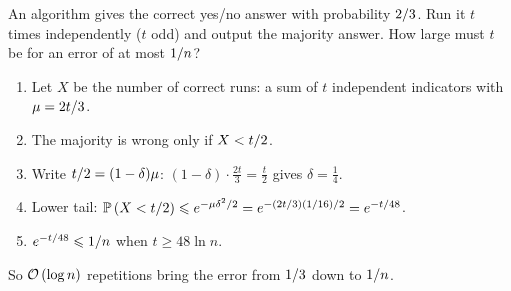 \begin{exercisebox}
\begin{pproblem}\label{pp:majority}
    An algorithm gives the correct yes/no answer with probability $2/3$. Run it $t$ times
    independently ($t$ odd) and output the majority answer. How large must $t$ be for an error of at
    most $1/n$?
\end{pproblem}
\tcblower
\begin{wsolution}
    \leavevmode
    \begin{enumerate}
        \item Let $X$ be the number of correct runs: a sum of $t$ independent indicators with
              $\mu = 2t/3$.
        \item The majority is wrong only if $X < t/2$.
        \item Write $t/2 = (1 - \delta)\mu$: $(1 - \delta) \cdot \frac{2t}{3} = \frac{t}{2}$
              gives $\delta = \frac{1}{4}$.
        \item Lower tail:
              $\operatorname{\mathbb{P}}\left(X < t/2\right) \leqslant e^{-\mu\delta^2/2} = e^{-(2t/3)(1/16)/2} = e^{-t/48}$.
        \item $e^{-t/48} \leqslant 1/n$ when $t \geq 48 \ln n$.
    \end{enumerate}
    So $\mathcal{O}\left(\log n\right)$ repetitions bring the error from $1/3$ down to $1/n$.
\end{wsolution}
\end{exercisebox}

